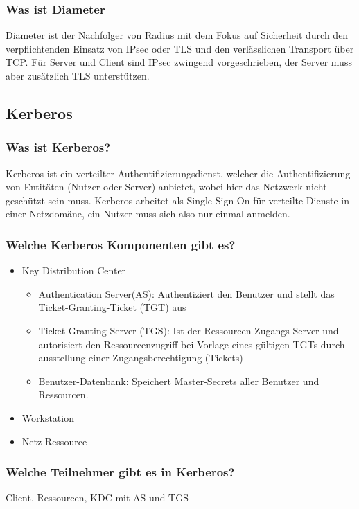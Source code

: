 	\subsubsection{Was ist Diameter}
	Diameter ist der Nachfolger von Radius mit dem Fokus auf Sicherheit durch den verpflichtenden Einsatz von IPsec oder TLS und den verlässlichen Transport über TCP. Für Server und Client sind IPsec zwingend vorgeschrieben, der Server muss aber zusätzlich TLS unterstützen.
	
\subsection{Kerberos}
	\subsubsection{Was ist Kerberos?} 	
	Kerberos ist ein verteilter Authentifizierungsdienst, welcher die Authentifizierung von Entitäten (Nutzer oder Server) anbietet, wobei hier das Netzwerk nicht geschützt sein muss. Kerberos arbeitet als Single Sign-On für verteilte Dienste in einer Netzdomäne, ein Nutzer muss sich also nur einmal anmelden.
	
	\subsubsection{Welche Kerberos Komponenten gibt es?}
	\begin{itemize}
		\item Key Distribution Center
			\begin{itemize}
				\item Authentication Server(AS): Authentiziert den Benutzer und stellt das Ticket-Granting-Ticket (TGT) aus
				\item Ticket-Granting-Server (TGS): Ist der Ressourcen-Zugangs-Server und autorisiert den Ressourcenzugriff bei Vorlage eines gültigen TGTs durch ausstellung einer Zugangsberechtigung (Tickets)
				\item Benutzer-Datenbank: Speichert Master-Secrets aller Benutzer und Ressourcen.
			\end{itemize}
			\item Workstation
			\item Netz-Ressource
	\end{itemize}
	
	\subsubsection{Welche Teilnehmer gibt es in Kerberos?}
	Client, Ressourcen, KDC mit AS und TGS

